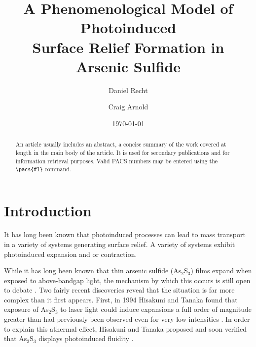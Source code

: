 \documentclass[twocolumn,showpacs,preprintnumbers,amsmath,amssymb]{revtex4}
\begin{document}

\title{A Phenomenological Model of Photoinduced\\ Surface Relief Formation in Arsenic Sulfide}%

\author{Daniel Recht}
\author{Craig Arnold}%
%
\date{\today}%

\begin{abstract}
An article usually includes an abstract, a concise summary of the work covered at length
in the main body of the article. It is used for secondary publications and for
information retrieval purposes. Valid PACS numbers may be entered using the
\verb+\pacs{#1}+ command.
\end{abstract}

\maketitle

\section{\label{sec:intro}Introduction}

It has long been known that photoinduced processes can lead to mass transport in a
variety of systems generating surface relief.  A variety of systems exhibit photoinduced
expansion and or contraction.


 While it has long been known that thin arsenic sulfide (As$_{2}$S$_{3}$) films
expand when exposed to above-bandgap light, the mechanism by which this occurs is still
open to debate \cite{igo74, hegedus, ganjoo}. Two fairly recent discoveries reveal that
the situation is far more complex than it first appears. First, in 1994 Hisakuni and
Tanaka found that exposure of As$_{2}$S$_{3}$ to laser light could induce expansions a
full order of magnitude greater than had previously been observed even for very low
intensities \cite{hisakuni94}. In order to explain this athermal effect, Hisakuni and
Tanaka proposed and soon verified that As$_{2}$S$_{3}$ displays photoinduced fluidity
\cite{hisakuni95}.
\end{document}
